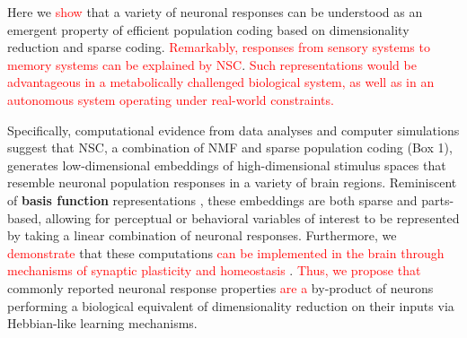 Here we \textcolor{red}{show} that a variety of neuronal responses
can be understood as an emergent property of efficient population coding
based on dimensionality reduction and sparse coding. \textcolor{red}{Remarkably, responses from sensory systems to memory systems can be explained by \ac{NSC}}.
\textcolor{red}{Such representations would be advantageous in a metabolically challenged biological system, as well as in an autonomous system operating under real-world constraints.}

Specifically, computational evidence from data analyses and computer simulations suggest that \ac{NSC}, a combination of \ac{NMF} \citep{PaateroTapper1994,LeeSeung1999} and sparse population coding \citep{Field1994} (Box 1), generates low-dimensional embeddings of 
high-dimensional stimulus spaces 
that resemble neuronal population responses 
in a variety of brain regions. Reminiscent of \textbf{basis function} representations
\citep{PougetSejnowski1997,PougetSnyder2000,Poggio1990},
these embeddings are both sparse and parts-based,
allowing for perceptual or behavioral variables of interest
to be represented by taking a linear combination of neuronal responses.
Furthermore, we \textcolor{red}{demonstrate} that these computations \textcolor{red}{can be implemented in the brain
through mechanisms of synaptic plasticity and homeostasis}
\citep{Nessler2009,Carlson2013,MorenoBoteDrugowitsch2015,Oja1982}. \textcolor{red}{Thus, we propose that} 
commonly reported neuronal response properties \textcolor{red}{are a} 
by-product of neurons performing a biological equivalent of 
dimensionality reduction on their inputs 
via Hebbian-like learning mechanisms.
